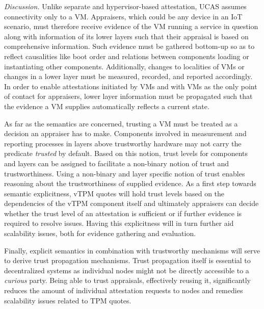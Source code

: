 \emph{Discussion.} Unlike separate and hypervisor-based attestation, UCAS assumes connectivity only to a VM. Appraisers, which could be any device in an IoT scenario, must therefore receive evidence of the VM running a service in question along with information of its lower layers such that their appraisal is based on comprehensive information. Such evidence must be gathered bottom-up so as to reflect causalities like boot order and relations between components loading or instantiating other components. Additionally, changes to localities of VMs or changes in a lower layer must be measured, recorded, and reported accordingly. In order to enable attestations initiated by VMs and with VMs as the only point of contact for appraisers, lower layer information must be propagated such that the evidence a VM supplies automatically reflects a current state.

As far as the semantics are concerned, trusting a VM must be treated as a decision an appraiser has to make. Components involved in measurement and reporting processes in layers above trustworthy hardware may not carry the predicate \emph{trusted} by default. Based on this notion, trust levels for components and layers can be assigned to facilitate a non-binary notion of trust and trustworthiness. Using a non-binary and layer specific notion of trust enables reasoning about the trustworthiness of supplied evidence. As a first step towards semantic explicitness, vTPM quotes will hold trust levels based on the dependencies of the vTPM component itself and ultimately appraisers can decide whether the trust level of an attestation is sufficient or if further evidence is required to resolve issues. Having this explicitness will in turn further aid scalability issues, both for evidence gathering and evaluation. 

Finally, explicit semantics in combination with trustworthy mechanisms will serve to derive trust propagation mechanisms. Trust propagation itself is essential to decentralized systems as individual nodes might not be directly accessible to a \emph{curious} party. Being able to trust appraisals, effectively reusing it, significantly reduces the amount of individual attestation requests to nodes and remedies scalability issues related to TPM quotes. 
